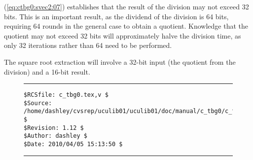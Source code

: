 \noindent{}(\ref{eq:ctbg0:svec2:07})
establishes that the result of the division may not exceed 32 bits.  This is
an important result, as the dividend of the division is 64 bits, requiring
64 rounds in the general case to obtain a quotient.  Knowledge that the
quotient may not exceed 32 bits will approximately halve the division time, as
only 32 iterations rather than 64 need to be performed.

The square root extraction will involve a 32-bit input (the quotient from the
division) and a 16-bit result.


\noindent\begin{figure}[!b]
\noindent\rule[-0.25in]{\textwidth}{1pt}
\begin{tiny}
\begin{verbatim}
$RCSfile: c_tbg0.tex,v $
$Source: /home/dashley/cvsrep/uculib01/uculib01/doc/manual/c_tbg0/c_tbg0.tex,v $
$Revision: 1.12 $
$Author: dashley $
$Date: 2010/04/05 15:13:50 $
\end{verbatim}
\end{tiny}
\noindent\rule[0.25in]{\textwidth}{1pt}
\end{figure}

%
%
%
%
%
%
%
%
%
%
%
%


